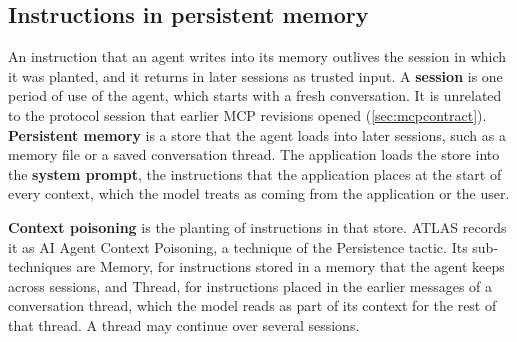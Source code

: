 \subsection{Instructions in persistent memory}
\label{sec:attacks-memory}

An instruction that an agent writes into its memory outlives the session in which it was planted,
and it returns in later sessions as trusted input. A \textbf{session} is one period of use of the
agent, which starts with a fresh conversation. It is unrelated to the protocol session that earlier
MCP revisions opened (\cref{sec:mcpcontract}). \textbf{Persistent memory} is a store that the agent
loads into later sessions, such as a memory file or a saved conversation thread. The application
loads the store into the \textbf{system prompt}, the instructions that the application places at
the start of every context, which the model treats as coming from the application or the user.

\textbf{Context poisoning} is the planting of instructions in that store. ATLAS records it as AI
Agent Context Poisoning, a technique of the Persistence tactic. Its sub-techniques are Memory, for
instructions stored in a memory that the agent keeps across sessions, and Thread, for instructions
placed in the earlier messages of a conversation thread, which the model reads as part of its
context for the rest of that thread. A thread may continue over several sessions.

